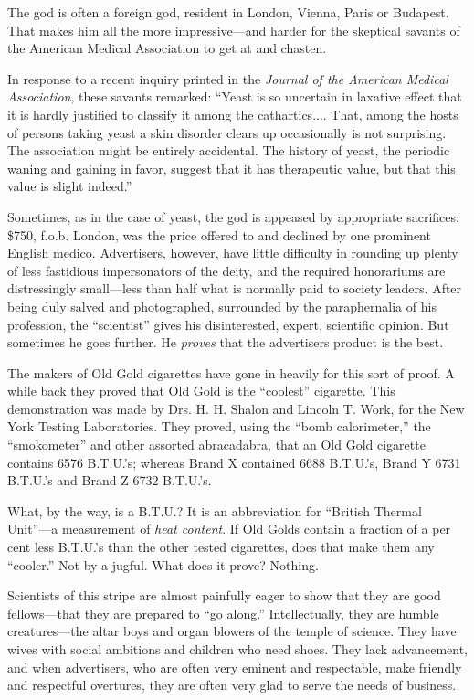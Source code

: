 \documentclass[nohyper,openany,nobib]{tufte-book}
\begin{document}
The god is often a foreign god, resident in London, Vienna, Paris or
Budapest. That makes him all the more impressive---and harder for the
skeptical savants of the American Medical Association to get at and
chasten.

In response to a recent inquiry printed in the \emph{Journal of the
American Medical Association}, these savants remarked: ``Yeast is so
uncertain in laxative effect that it is hardly justified to classify it
among the cathartics.... That, among the hosts of persons taking yeast a
skin disorder clears up occasionally is not surprising. The association
might be entirely accidental. The history of yeast, the periodic waning
and gaining in favor, suggest that it has therapeutic value, but that
this value is slight indeed.''

Sometimes, as in the case of yeast, the god is appeased by appropriate
sacrifices: \$750, f.o.b. London, was the price offered to and declined
by one prominent English medico. Advertisers, however, have little
difficulty in rounding up plenty of less fastidious impersonators of the
deity, and the required honorariums are distressingly small---less than
half what is normally paid to society leaders. After being duly salved
and photographed, surrounded by the paraphernalia of his profession, the
``scientist'' gives his disinterested, expert, scientific opinion. But
sometimes he goes further. He \emph{proves} that the advertisers product
is the best.

The makers of Old Gold cigarettes have gone in heavily for this sort of
proof. A while back they proved that Old Gold is the ``coolest''
cigarette. This demonstration was made by Drs. H. H. Shalon and Lincoln
T. Work, for the New York Testing Laboratories. They proved, using the
``bomb calorimeter,'' the ``smokometer'' and other assorted abracadabra,
that an Old Gold cigarette contains 6576 B.T.U.'s; whereas Brand X
contained 6688 B.T.U.'s, Brand Y 6731 B.T.U.'s and Brand Z 6732
B.T.U.'s.

What, by the way, is a B.T.U.? It is an abbreviation for ``British
Thermal Unit''---a measurement of \emph{heat content}. If Old Golds
contain a fraction of a per cent less B.T.U.'s than the other tested
cigarettes, does that make them any ``cooler.'' Not by a jugful. What
does it prove? Nothing.

Scientists of this stripe are almost painfully eager to show that they
are good fellows---that they are prepared to ``go along.''
Intellectually, they are humble creatures---the altar boys and organ
blowers of the temple of science. They have wives with social ambitions
and children who need shoes. They lack advancement, and when
advertisers, who are often very eminent and respectable, make friendly
and respectful overtures, they are often very glad to serve the needs of
business.
\end{document}
